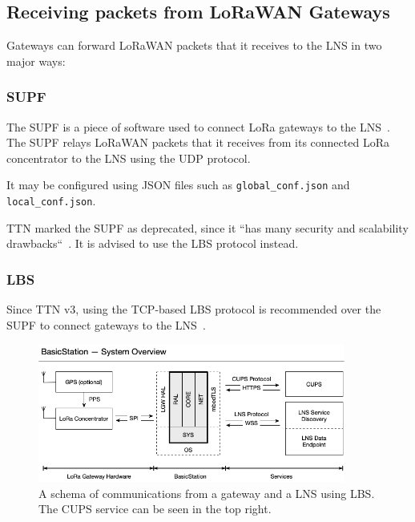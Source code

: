 \subsection{Receiving packets from \acs{LoRaWAN} Gateways}

Gateways can forward \ac{LoRaWAN} packets that it receives to the \ac{LNS} in two major ways:

\subsubsection{\acf{SUPF}}

The \ac{SUPF} is a piece of software used to connect \ac{LoRa} gateways to the \ac{LNS}~\cite{the_things_industries_bv_semtech_2022}.
The \ac{SUPF} relays \ac{LoRaWAN} packets that it receives from its connected \ac{LoRa} concentrator to the \ac{LNS} using the \ac{UDP} protocol.

It may be configured using JSON files such as \lstinline{global_conf.json} and \lstinline{local_conf.json}.

\ac{TTN} marked the \acl{SUPF} as deprecated, since it ``has many security and scalability drawbacks``~\cite{the_things_industries_bv_semtech_2022}.
It is advised to use the \acl{LBS} protocol instead.

\subsubsection{\acf{LBS}}

Since \ac{TTN} v3, using the \ac{TCP}-based \acl{LBS} protocol is recommended over the \ac{SUPF} to connect gateways to the \ac{LNS}~\cite{the_things_industries_bv_semtech_2022}.

\begin{figure}[htbp]
    \centering
    \includegraphics[width=0.9\textwidth]{pictures/lorawan-structure/lora-basics-station-structure.png}
    \caption{
        A schema of communications from a gateway and a \ac{LNS} using \acf{LBS}.
        The \ac{CUPS} service can be seen in the top right.~\protect\cite{semtech_lora_developer_portal_lora_2022}
    }\label{pic:lora-basics-station-schema}
\end{figure}

